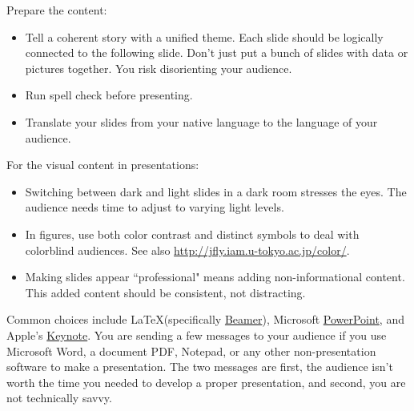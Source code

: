 
Prepare the content:
\begin{itemize}
    \item Tell a coherent story with a unified theme. Each slide should be logically connected to the following slide. Don't just put a bunch of slides with data or pictures together. You risk disorienting your audience.
    \item Run spell check before presenting.
    \item Translate your slides from your native language to the language of your audience.
\end{itemize}


For the visual content in presentations:
\begin{itemize}
    \item Switching between dark and light slides in a dark room stresses the eyes. The audience needs time to adjust to varying light levels.
    \item In figures, use both color contrast and distinct symbols to deal with colorblind audiences. See also \href{http://jfly.iam.u-tokyo.ac.jp/color/}{http://jfly.iam.u-tokyo.ac.jp/color/}.
    \item Making slides appear ``professional" means adding non-informational content. This added content should be consistent, not distracting.
\end{itemize}

Common choices include \LaTeX (specifically \href{https://en.wikipedia.org/wiki/Beamer_(LaTeX)}{Beamer}), 
\iftoggle{WPinmargin}{\marginpar{$>$Wikipedia: Beamer}}{}
Microsoft \href{https://en.wikipedia.org/wiki/Microsoft_PowerPoint}{PowerPoint}, 
and Apple's \href{https://en.wikipedia.org/wiki/Keynote_(presentation_software)}{Keynote}. 
You are sending a few messages to your audience if you use Microsoft Word, a document PDF, Notepad, or any other non-presentation software to make a presentation.
The two messages are first, the audience isn't worth the time you needed to develop a proper presentation, and second, you are not technically savvy.

